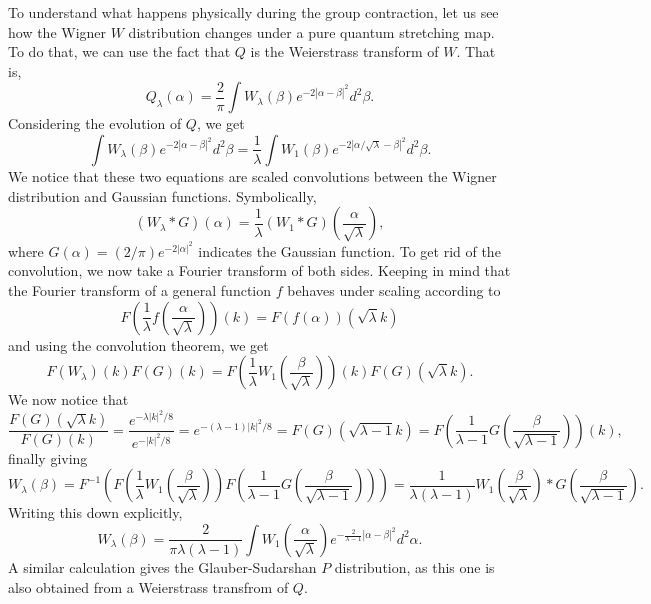 \documentclass{article}
\begin{document}
To understand what happens physically during the group contraction, let us see how the Wigner $W$ distribution changes under a pure quantum stretching map. To do that, we can use the fact that $Q$ is the Weierstrass transform of $W$. That is,
\begin{equation}
    Q_\lambda(\alpha)=\frac{2}{\pi}\int W_\lambda(\beta)e^{-2|\alpha-\beta|^2}d^2\beta.
\end{equation}
Considering the evolution of $Q$, we get
\begin{equation}
    \int W_\lambda(\beta)e^{-2|\alpha-\beta|^2}d^2\beta=\frac{1}{\lambda}\int W_1(\beta)e^{-2|\alpha/\sqrt{\lambda}-\beta|^2}d^2\beta.
\end{equation}
We notice that these two equations are scaled convolutions between the Wigner distribution and Gaussian functions. Symbolically,
\begin{equation}
    (W_\lambda \ast G)(\alpha)=\frac{1}{\lambda}(W_1\ast G)\left(\frac{\alpha}{\sqrt{\lambda}}\right),
\end{equation}
where $G(\alpha)=(2/\pi) e^{-2|\alpha|^2}$ indicates the Gaussian function. To get rid of the convolution, we now take a Fourier transform of both sides. Keeping in mind that the Fourier transform of a general function $f$ behaves under scaling according to
\begin{equation}
    F\left(\frac{1}{\lambda}f\left(\frac{\alpha}{\sqrt{\lambda}}\right)\right)(k)=F(f(\alpha))(\sqrt{\lambda}k)
\end{equation} and using the convolution theorem, we get
\begin{equation}
  F(W_\lambda)(k)F(G)(k)=F\left(\frac{1}{\lambda}W_1\left(\frac{\beta}{\sqrt{\lambda}}\right)\right)(k)F(G)(\sqrt{\lambda}k).  
\end{equation}
We now notice that
\begin{equation}
    \frac{F(G)(\sqrt{\lambda}k)}{F(G)(k)}=\frac{e^{-\lambda|k|^2/8}}{e^{-|k|^2/8}}=e^{-(\lambda-1)|k|^2/8}=F(G)(\sqrt{\lambda-1}k)=F\left(\frac{1}{\lambda-1}G\left(\frac{\beta}{\sqrt{\lambda-1}}\right)\right)(k),
\end{equation}
finally giving
\begin{equation}
    W_\lambda(\beta)=F^{-1}\left(F\left(\frac{1}{\lambda}W_1\left(\frac{\beta}{\sqrt{\lambda}}\right)\right)F\left(\frac{1}{\lambda-1}G\left(\frac{\beta}{\sqrt{\lambda-1}}\right)\right)\right)=\frac{1}{\lambda(\lambda-1)}W_1\left(\frac{\beta}{\sqrt{\lambda}}\right) \ast G\left(\frac{\beta}{\sqrt{\lambda-1}}\right).
    \label{Fourier}
\end{equation}
Writing this down explicitly,
\begin{equation}
   W_\lambda(\beta)=\frac{2}{\pi\lambda(\lambda-1)}\int W_1\left(\frac{\alpha}{\sqrt{\lambda}}\right)e^{-\frac{2}{\lambda-1}\left|\alpha-\beta\right|^2}d^2\alpha.
\end{equation}
A similar calculation gives the Glauber-Sudarshan $P$ distribution, as this one is also obtained from a Weierstrass transfrom of $Q$.
\end{document}
